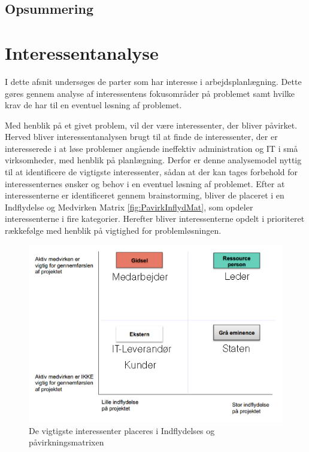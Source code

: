 \subsection{Opsummering}




\section{Interessentanalyse}
I dette afsnit undersøges de parter som har interesse i arbejdsplanlægning. Dette gøres gennem analyse af interessentens fokusområder på problemet samt hvilke krav de har til en eventuel løsning af problemet.

Med henblik på et givet problem, vil der være interessenter, der bliver påvirket. Herved bliver interessentanalysen brugt til at finde de interessenter, der er interesserede i at løse problemer angående ineffektiv administration og IT i små virksomheder, med henblik på planlægning.
Derfor er denne analysemodel nyttig til at identificere de vigtigste interessenter, sådan at der kan tages forbehold for interessenternes ønsker og behov i en eventuel løsning af problemet. Efter at interessenterne er identificeret gennem brainstorming, bliver de placeret i en Indflydelse og Medvirken Matrix \ref{fig:PavirkInflydMat}, som opdeler interessenterne i fire kategorier. Herefter bliver interessenterne opdelt i prioriteret rækkefølge med henblik på vigtighed for problemløsningen.

\begin{figure}[H]
\centering
\includegraphics{figures/IndflydelsePaaMatrixMedInteress.png}
\caption{De vigtigste interessenter placeres i Indflydelses og påvirkningsmatrixen}
\label{fig:InteressentMatrix}
\end{figure}


